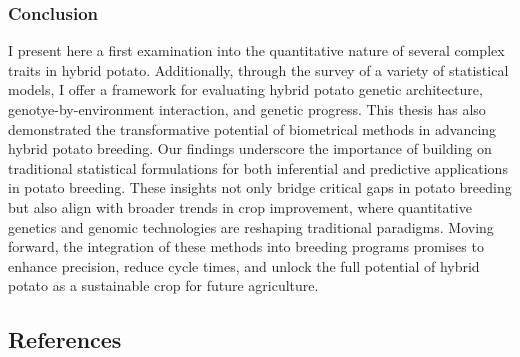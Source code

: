 \documentclass[
]{article}
\begin{document}
\subsubsection{Conclusion}\label{conclusion}

I present here a first examination into the quantitative nature of
several complex traits in hybrid potato. Additionally, through the
survey of a variety of statistical models, I offer a framework for
evaluating hybrid potato genetic architecture, genotye-by-environment
interaction, and genetic progress. This thesis has also demonstrated the
transformative potential of biometrical methods in advancing hybrid
potato breeding. Our findings underscore the importance of building on
traditional statistical formulations for both inferential and predictive
applications in potato breeding. These insights not only bridge critical
gaps in potato breeding but also align with broader trends in crop
improvement, where quantitative genetics and genomic technologies are
reshaping traditional paradigms. Moving forward, the integration of
these methods into breeding programs promises to enhance precision,
reduce cycle times, and unlock the full potential of hybrid potato as a
sustainable crop for future agriculture.

\subsection{References}\label{references}


\printbibliography
\end{document}
